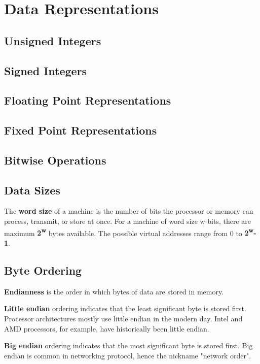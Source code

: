\chapter{Data Representations}

\section{Unsigned Integers}

\section{Signed Integers}

\section{Floating Point Representations}

\section{Fixed Point Representations}

\section{Bitwise Operations}

\section{Data Sizes}
The \textbf{word size} of a machine is the number of bits the processor or memory can process, transmit, or store at once. For a machine of word size w bits, there are maximum \textbf{2\textsuperscript{w}} bytes available. The possible virtual addresses range from 0 to \textbf{2\textsuperscript{w}-1}.


\section{Byte Ordering}

\textbf{Endianness} is the order in which bytes of data are stored in memory.

\textbf{Little endian} ordering indicates that the least significant byte is stored first. Processor architectures mostly use little endian in the modern day. Intel and AMD processors, for example, have historically been little endian.

\textbf{Big endian} ordering indicates that the most significant byte is stored first. Big endian is common in networking protocol, hence the nickname "network order".

